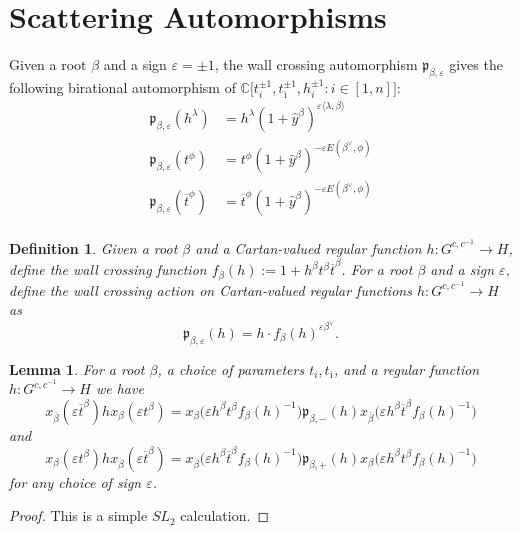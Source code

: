 \documentclass{amsart}
\newtheorem{definition}[theorem]{Definition}
\newtheorem{lemma}[theorem]{Lemma}
\numberwithin{theorem}{section}
\newcommand{\fp}{\mathfrak{p}}
\newcommand{\CC}{\mathbb{C}}
\newcommand{\obeta}{{\overline{\beta}}}
\newcommand{\oi}{{\overline{\imath}}}
\newcommand{\ot}{{\overline{t}}}
\begin{document}
  \section{Scattering Automorphisms}
    Given a root $\beta$ and a sign $\varepsilon=\pm1$, the wall crossing automorphism $\fp_{\beta,\varepsilon}$ gives the following birational automorphism of $\CC\big[t_i^{\pm1},t_\oi^{\pm1},h_i^{\pm1}:i\in[1,n]\big]$: 
    \begin{align*}
      \fp_{\beta,\varepsilon}(h^\lambda) &= h^\lambda (1+\hat y^\beta)^{\varepsilon \langle\lambda,\beta\rangle}\\
      \fp_{\beta,\varepsilon}(t^\phi) &= t^\phi (1+\hat y^\beta)^{-\varepsilon E(\beta^\vee,\phi)}\\
      \fp_{\beta,\varepsilon}(\ot^\phi) &= \ot^\phi (1+\hat y^\beta)^{-\varepsilon E(\beta^\vee,\phi)}\\
    \end{align*}

    \begin{definition}
      Given a root $\beta$ and a Cartan-valued regular function $h:G^{c,c^{-1}}\to H$, define the wall crossing function $f_\beta(h):=1+h^\beta t^\beta \ot^\beta$.
      For a root $\beta$ and a sign $\varepsilon$, define the wall crossing action on Cartan-valued regular functions $h:G^{c,c^{-1}}\to H$ as 
      \[\fp_{\beta,\varepsilon}(h)=h\cdot f_\beta(h)^{\varepsilon\beta^\vee}.\]
    \end{definition}
    \begin{lemma}
      For a root $\beta$, a choice of parameters $t_i, t_\oi$, and a regular function $h:G^{c,c^{-1}}\to H$ we have
      \[x_\obeta(\varepsilon \ot^\beta) h x_\beta(\varepsilon t^\beta) = x_\beta\big(\varepsilon h^\beta t^\beta f_\beta(h)^{-1}\big) \fp_{\beta,-}(h) x_\obeta\big(\varepsilon h^\beta \ot^\beta f_\beta(h)^{-1}\big)\]
      and
      \[x_\beta(\varepsilon t^\beta) h x_\obeta(\varepsilon \ot^\beta) = x_\obeta\big(\varepsilon h^\beta \ot^\beta f_\beta(h)^{-1}\big) \fp_{\beta,+}(h) x_\beta\big(\varepsilon h^\beta t^\beta f_\beta(h)^{-1}\big)\]
      for any choice of sign $\varepsilon$.
    \end{lemma}
    \begin{proof}
      This is a simple $SL_2$ calculation.
    \end{proof}
 
\end{document}
